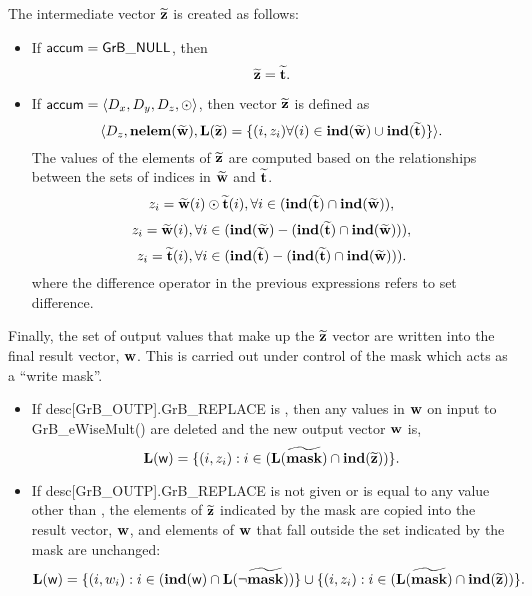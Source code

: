The intermediate vector ${\bf \widetilde{z}}$ is created as follows:
\begin{itemize}
    \item If ${\sf accum} = {\sf GrB\_NULL}$, then \[ {\bf \widetilde{z}} = {\bf \widetilde{t}}.\]

    \item If ${\sf accum} = \langle D_x, D_y, D_z, \odot \rangle$, then vector ${\bf \widetilde{z}}$ is defined as 
        \[ \langle D_z, \bold{nelem}({\bf \widetilde{w}}), \bold{L}({\bf \widetilde{z}})
		= \{(i,z_{i})  \forall (i) \in \bold{ind}({\bf \widetilde{w}}) \cup 
        \bold{ind}({\bf \widetilde{t}}) \} \rangle.\]
    The values of the elements of ${\bf \widetilde{z}}$ are computed based on the relationships between the sets of indices in ${\bf \widetilde{w}}$ and ${\bf \widetilde{t}}$.
\[
z_{i} = {\bf \widetilde{w}}(i) \odot {\bf \widetilde{t}}(i), \forall i \in  (\bold{ind}({\bf \widetilde{t}}) \cap \bold{ind}({\bf \widetilde{w}})),
\]
\[
z_{i} = {\bf \widetilde{w}}(i), \forall i \in  (\bold{ind}({\bf \widetilde{w}}) - (\bold{ind}({\bf \widetilde{t}}) \cap \bold{ind}({\bf \widetilde{w}}))),
\]
\[
z_{i} = {\bf \widetilde{t}}(i), \forall i \in  (\bold{ind}({\bf \widetilde{t}}) - (\bold{ind}({\bf \widetilde{t}}) \cap \bold{ind}({\bf \widetilde{w}}))).
\]
where the difference operator in the previous expressions refers to set difference.
\end{itemize}

Finally, the set of output values that make up the ${\bf \widetilde{z}}$ 
vector are written into the final result vector, ${\bf w}$. 
This is carried out under control of the mask which acts as a ``write mask''.
\begin{itemize}
\item If {\sf desc[GrB\_OUTP].GrB\_REPLACE} is \true, then any values in ${\bf w}$ 
on input to {\sf GrB\_eWiseMult()} are deleted and the new output vector ${\bf w}$ is,
\[ \bold{L}({\sf w}) = \{(i,z_{i}) : i \in (\bold{L}({\bf \widetilde{mask}}) 
\cap \bold{ind}({\bf \widetilde{z}})) \}. \]

\item If {\sf desc[GrB\_OUTP].GrB\_REPLACE} is not given or is equal to any 
value other than \true, the elements of ${\bf \widetilde{z}}$ indicated by 
the mask are copied into the result vector, ${\bf w}$, and elements of 
${\bf w}$ that fall outside the set indicated by the mask are unchanged:
\[ \bold{L}({\sf w}) = \{(i,w_{i}) : i \in (\bold{ind}({\bf \sf w}) 
\cap \bold{L}(\neg {\bf \widetilde{mask}})) \} \cup \{(i,z_{i}) : i \in 
(\bold{L}({\bf \widetilde{mask}}) \cap \bold{ind}({\bf \widetilde{z}})) \}. \]
\end{itemize}

